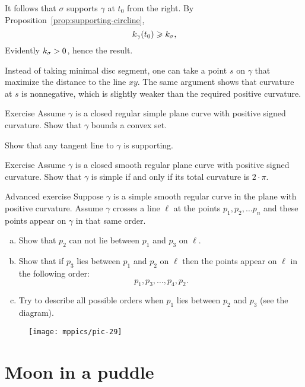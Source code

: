 It follows that $\sigma$ supports $\gamma$ at $t_0$ from the right.
By Proposition~\ref{prop:supporting-circline}, 
\[k_\gamma(t_0)\geqslant k_\sigma,\]
Evidently $k_\sigma>0$, hence the result.
\qeds

Instead of taking minimal disc segment, one can take a point $s$ on $\gamma$ that maximize the distance to the line $xy$.
The same argument shows that curvature at $s$ is nonnegative, which is slightly weaker than the required positive curvature.

\begin{thm}{Exercise}
Assume $\gamma$ is a closed regular simple plane curve with positive signed curvature.
Show that $\gamma$ bounds a convex set.
\end{thm}

 Show that any tangent line to $\gamma$ is supporting.

\begin{thm}{Exercise}\label{ex:convex+2pi}
Assume $\gamma$ is a closed smooth regular plane curve with positive signed curvature.
Show that $\gamma$ is simple if and only if its total curvature is $2\cdot\pi$. 
\end{thm}

\begin{thm}{Advanced exercise}
Suppose $\gamma$ is a simple smooth regular curve in the plane with positive curvature.
Assume $\gamma$ crosses a line $\ell$ at the points $p_1,p_2,\dots p_n$ and these points appear on $\gamma$ in that same order.
\begin{enumerate}[(a)]

\item Show that $p_2$ can not lie between $p_1$ and $p_3$ on $\ell$.

\item Show that if $p_3$ lies between $p_1$ and $p_2$ on $\ell$ then the points appear on $\ell$ in the following order:  
\[p_1,p_3,\dots,p_4 ,p_2.\]

\item Try to describe all possible orders when $p_1$ lies between $p_2$ and $p_3$ (see the diagram).

\end{enumerate}
\end{thm}

\begin{figure}[h!]
\vskip-0mm
\centering
\texttt{[image: mppics/pic-29]}
\vskip0mm
\end{figure}

\section*{Moon in a puddle}

